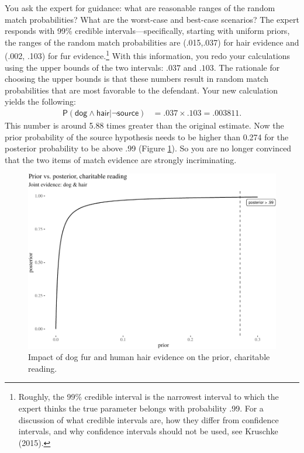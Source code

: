 \documentclass[
  10pt,
  dvipsnames,enabledeprecatedfontcommands]{scrartcl}
\newcommand{\s}[1]{\mbox{$\mathsf{#1}$}}
\begin{document}
You ask the expert for guidance: what are reasonable ranges of the
random match probabilities? What are the worst-case and best-case
scenarios? The expert responds with 99\% credible
intervals---specifically, starting with uniform priors, the ranges of
the random match probabilities are (.015,.037) for hair evidence and
(.002, .103) for fur evidence.\footnote{Roughly, the 99\% credible
  interval is the narrowest interval to which the expert thinks the true
  parameter belongs with probability .99. For a discussion of what
  credible intervals are, how they differ from confidence intervals, and
  why confidence intervals should not be used, see Kruschke (2015).}
With this information, you redo your calculations using the upper bounds
of the two intervals: \(.037\) and \(.103\). The rationale for choosing
the upper bounds is that these numbers result in random match
probabilities that are most favorable to the defendant. Your new
calculation yields the following: \begin{align*}
\mathsf{P}(\s{dog}\wedge \s{hair} \vert \neg \s{source})   & =  .037 \times .103 =.003811.
\end{align*} This number is around 5.88 times greater than the original
estimate. Now the prior probability of the source hypothesis needs to be
higher than 0.274 for the posterior probability to be above .99 (Figure
\ref{fig:impactOfCharitable}). So you are no longer convinced that the
two items of match evidence are strongly incriminating.

\begin{figure}[H]

\begin{center}\includegraphics[width=0.6\linewidth]{imprecision_philosophical_paper2_files/figure-latex/FigcharitableImpact75-1} \end{center}

\caption{Impact of dog fur and human hair evidence on the prior, charitable reading.}
\label{fig:impactOfCharitable}
\end{figure}
\end{document}
